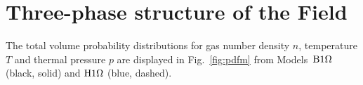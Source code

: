 \section{Three-phase structure of the Field}\label{sect:3BB}

  The total volume probability distributions for gas number density $n$, 
  temperature $T$ and thermal pressure $p$ are displayed in Fig.~\ref{fig:pdfm}
  from Models~${\mathrm{B}1\rm{\Omega} }$ (black, solid) and ${\mathrm{H}1\rm{\Omega}}$ (blue, dashed). 
